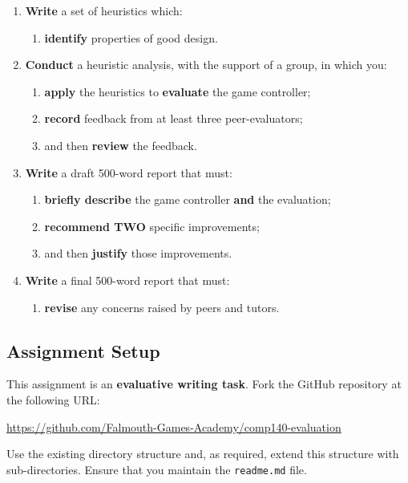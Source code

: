 \documentclass{../fal_assignment}
\begin{document}
\begin{enumerate}[label=(\alph*)]
    \item \textbf{Write} a set of heuristics which:
    	\begin{enumerate}[label=\roman*.]
    		\item \textbf{identify} properties of good design.
	\end{enumerate}
    \item \textbf{Conduct} a heuristic analysis, with the support of a group, in which you:
    	\begin{enumerate}[label=\roman*.]
    		\item \textbf{apply} the heuristics to \textbf{evaluate} the game controller;
      		\item \textbf{record} feedback from at least three peer-evaluators;
    		\item and then \textbf{review} the feedback.
	\end{enumerate}
    \item \textbf{Write} a draft 500-word report that must:
    	\begin{enumerate}[label=\roman*.]
    		\item \textbf{briefly describe} the game controller \textbf{and} the evaluation;    
    		\item \textbf{recommend TWO} specific improvements;	
    		\item and then \textbf{justify} those improvements.
	\end{enumerate}
    \item \textbf{Write} a final 500-word report that must:
    	\begin{enumerate}[label=\roman*.]
    	          \item \textbf{revise} any concerns raised by peers and tutors. 
	\end{enumerate}
\end{enumerate}

\subsection*{Assignment Setup}

This assignment is an \textbf{evaluative writing task}. Fork the GitHub repository at the following URL:

\indent \url{https://github.com/Falmouth-Games-Academy/comp140-evaluation}

Use the existing directory structure and, as required, extend this structure with sub-directories. Ensure that you maintain the \texttt{readme.md} file.
\end{document}
